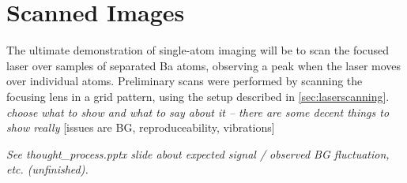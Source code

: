 \section{Scanned Images}
\label{sec:scanning}

The ultimate demonstration of single-atom imaging will be to scan the focused laser over samples of separated Ba atoms, observing a peak when the laser moves over individual atoms.  Preliminary scans were performed by scanning the focusing lens in a grid pattern, using the setup described in \ref{sec:laserscanning}.   \emph{\color{gray}choose what to show and what to say about it -- there are some decent things to show really}  [issues are BG, reproduceability, vibrations]

\emph{\color{gray}See thought\_process.pptx slide about expected signal / observed BG fluctuation, etc. (unfinished).}